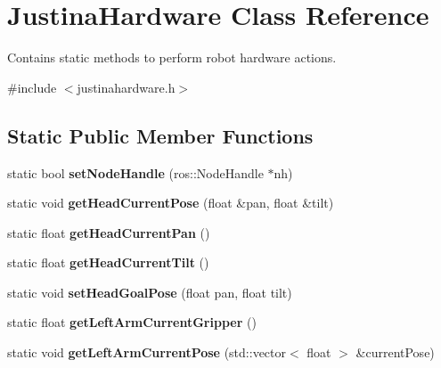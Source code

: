 \hypertarget{class_justina_hardware}{}\section{Justina\+Hardware Class Reference}
\label{class_justina_hardware}


Contains static methods to perform robot hardware actions.  




{\ttfamily \#include $<$justinahardware.\+h$>$}

\subsection*{Static Public Member Functions}
\begin{DoxyCompactItemize}
\item 
static bool {\bfseries set\+Node\+Handle} (ros\+::\+Node\+Handle $\ast$nh)\hypertarget{class_justina_hardware_a41324dde70ebed2535ca412e73378756}{}\label{class_justina_hardware_a41324dde70ebed2535ca412e73378756}

\item 
static void {\bfseries get\+Head\+Current\+Pose} (float \&pan, float \&tilt)\hypertarget{class_justina_hardware_ab5b03caf18d015eef2075790aa005339}{}\label{class_justina_hardware_ab5b03caf18d015eef2075790aa005339}

\item 
static float {\bfseries get\+Head\+Current\+Pan} ()\hypertarget{class_justina_hardware_ac02523358e4649e4a1a967d672b5d40f}{}\label{class_justina_hardware_ac02523358e4649e4a1a967d672b5d40f}

\item 
static float {\bfseries get\+Head\+Current\+Tilt} ()\hypertarget{class_justina_hardware_abb8da3eafa7429ca98373fd7d6826178}{}\label{class_justina_hardware_abb8da3eafa7429ca98373fd7d6826178}

\item 
static void {\bfseries set\+Head\+Goal\+Pose} (float pan, float tilt)\hypertarget{class_justina_hardware_a7ee4c0b75e6efea8651d4e90a046f94a}{}\label{class_justina_hardware_a7ee4c0b75e6efea8651d4e90a046f94a}

\item 
static float {\bfseries get\+Left\+Arm\+Current\+Gripper} ()\hypertarget{class_justina_hardware_afebad48dfcfe37ecbb55e2b2c26d1772}{}\label{class_justina_hardware_afebad48dfcfe37ecbb55e2b2c26d1772}

\item 
static void {\bfseries get\+Left\+Arm\+Current\+Pose} (std\+::vector$<$ float $>$ \&current\+Pose)\hypertarget{class_justina_hardware_a01b66498e25604040fc78f47e625d3e4}{}\label{class_justina_hardware_a01b66498e25604040fc78f47e625d3e4}


\end{DoxyCompactItemize}
